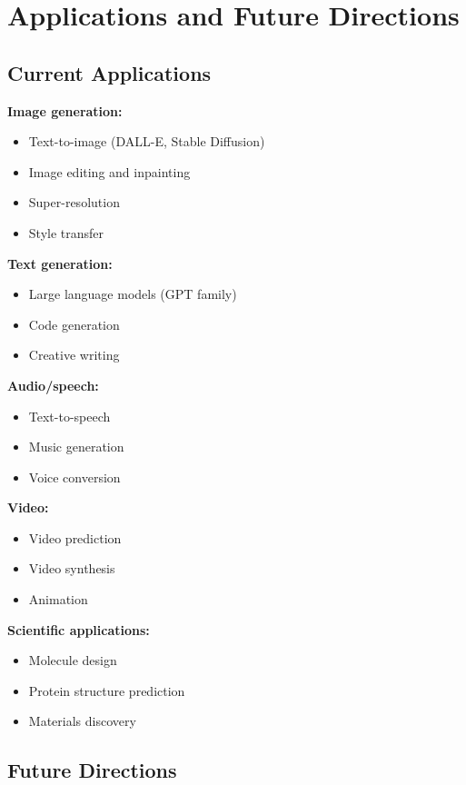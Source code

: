 
\section{Applications and Future Directions}
\label{sec:generative-applications}

\subsection{Current Applications}

\textbf{Image generation:}
\begin{itemize}
    \item Text-to-image (DALL-E, Stable Diffusion)
    \item Image editing and inpainting
    \item Super-resolution
    \item Style transfer
\end{itemize}

\textbf{Text generation:}
\begin{itemize}
    \item Large language models (GPT family)
    \item Code generation
    \item Creative writing
\end{itemize}

\textbf{Audio/speech:}
\begin{itemize}
    \item Text-to-speech
    \item Music generation
    \item Voice conversion
\end{itemize}

\textbf{Video:}
\begin{itemize}
    \item Video prediction
    \item Video synthesis
    \item Animation
\end{itemize}

\textbf{Scientific applications:}
\begin{itemize}
    \item Molecule design
    \item Protein structure prediction
    \item Materials discovery
\end{itemize}

\subsection{Future Directions}

